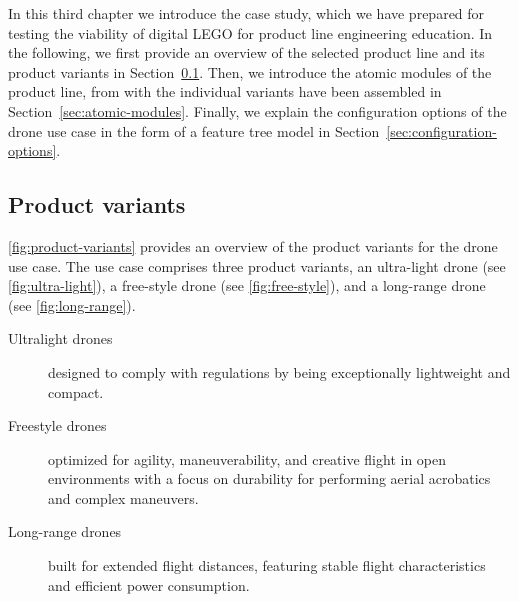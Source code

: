 \documentclass[sigconf,review]{acmart}
\begin{document}
In this third chapter we introduce the case study, which we have prepared for testing the viability of digital LEGO for product line engineering education.
In the following, we first provide an overview of the selected product line and its product variants in Section~\ref{sec:product-variants}.
Then, we introduce the atomic modules of the product line, from with the individual variants have been assembled in Section~\ref{sec:atomic-modules}.
Finally, we explain the configuration options of the drone use case in the form of a feature tree model in Section~\ref{sec:configuration-options}.

\subsection{Product variants}
\label{sec:product-variants}

\cref{fig:product-variants} provides an overview of the product variants for the drone use case.
The use case comprises three product variants, an ultra-light drone (see \cref{fig:ultra-light}), a free-style drone (see \cref{fig:free-style}), and a long-range drone (see \cref{fig:long-range}).

\begin{description}
    \item[Ultralight drones] designed to comply with regulations by being exceptionally lightweight and compact.
    \item[Freestyle drones] optimized for agility, maneuverability, and creative flight in open environments with a focus on durability for performing aerial acrobatics and complex maneuvers.
    \item[Long-range drones] built for extended flight distances, featuring stable flight characteristics and efficient power consumption.
\end{description}
\end{document}

